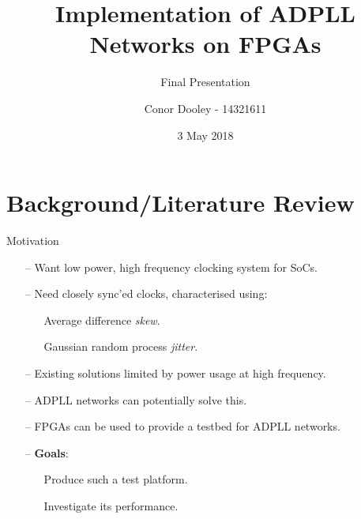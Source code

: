 \documentclass{beamer}
\title{Implementation of ADPLL Networks on FPGAs}
\author{Conor Dooley - 14321611}%
\subtitle{Final Presentation}
\date{3 May 2018}
\institute{Supervisors: B. Mulkeen \& Dr. E. Blokhina}
\begin{document}
\begin{frame}
    \titlepage
\end{frame}

\section*{Background/Literature Review}
\begin{frame}{Motivation}
    \begin{itemize}
        \item[--]
        	Want low power, high frequency clocking system for SoCs.
        \item[--]
            Need closely sync'ed clocks, characterised using:
    		\begin{itemize}
    			\item[]
    				Average difference \textit{skew}.
    			\item[]
	    			Gaussian random process \textit{jitter}.
    		\end{itemize}
    	\item[--]
    		Existing solutions limited by power usage at high frequency.
    	\item[--]
    		ADPLL networks can potentially solve this.
    	\item[--]
    		FPGAs can be used to provide a testbed for ADPLL networks.
    	\item[--]
    		\textbf{Goals}:
    		\begin{itemize}
    			\item[]
    			 Produce such a test platform.
    			\item[]
    				Investigate its performance.
    		\end{itemize}
    	
    \end{itemize}
\end{frame}
\end{document}
